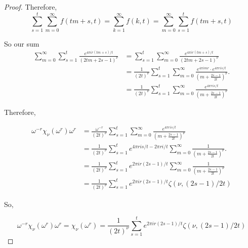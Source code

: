 \documentclass[../article.tex]{subfiles}
\begin{document}
\begin{proof}
Therefore,
\begin{equation}
\sum_{s=1}^{t} \sum_{m=0}^{\infty}  f(tm+s, t) = \sum_{k=1}^{\infty} f(k,t) = \sum_{m=0}^{\infty} \sum_{s=1}^{t} f(tm+s,t)
\end{equation}

So our sum
\begin{equation}
\begin{split}
\sum_{m=0}^{\infty} \sum_{s=1}^{t} \frac{e^{4 \pi ir(tm+s)/t}}{(2tm+2s-1)^{\nu}} &= \sum_{s=1}^{t} \sum_{m=0}^{\infty} \frac{e^{4 \pi ir(tm+s)/t}}{(2tm+2s-1)^{\nu}} \\
&= \frac{1}{(2t)^{\nu}} \sum_{s=1}^{t} \sum_{m=0}^{\infty} \frac{e^{4 \pi imr} \cdot e^{4 \pi r is/t}}{(m+\frac{2s-1}{2t})^{\nu}}. \\
&= \frac{1}{(2t)^{\nu}} \sum_{s=1}^{t} \sum_{m=0}^{\infty} \frac{e^{4 \pi r is/t}}{(m+\frac{2s-1}{2t})^{\nu}}
\end{split}
\end{equation}

Therefore,

\begin{equation}
\begin{split}
\omega^{-r}\chi_{\nu}(\omega^r)\omega^r &= \frac{\omega^{-r}}{(2t)^{\nu}} \sum_{s=1}^{t} \sum_{m=0}^{\infty} \frac{e^{4 \pi r is/t}}{(m+\frac{2s-1}{2t})^{\nu}} \\
&=\frac{1}{(2t)^{\nu}} \sum_{s=1}^{t} e^{4 \pi ris/t - 2 \pi ri/t} \sum_{m=0}^{\infty} \frac{1}{(m+\frac{2s-1}{2t})^{\nu}}. \\
&= \frac{1}{(2t)^{\nu}} \sum_{s=1}^{t} e^{2 \pi ir(2s-1)/t} \sum_{m=0}^{\infty} \frac{1}{(m+\frac{2s-1}{2t})^{\nu}} \\
&= \frac{1}{(2t)^{\nu}} \sum_{s=1}^{t} e^{2 \pi ir(2s-1)/t} \zeta(\nu, (2s-1)/2t)
\end{split}
\end{equation}

So,

\begin{equation}
\omega^{-r}\chi_{\nu}(\omega^r)\omega^r = \chi_{\nu}(\omega^r) = \frac{1}{(2t)^{\nu}} \sum_{s=1}^{t} e^{2 \pi ir(2s-1)/t} \zeta(\nu, (2s-1)/2t)
\end{equation}


\end{proof}
\end{document}
